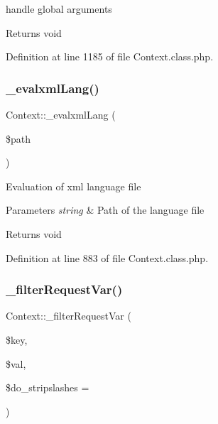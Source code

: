 handle global arguments

\begin{DoxyReturn}{Returns}
void 
\end{DoxyReturn}


Definition at line 1185 of file Context.\+class.\+php.

\hypertarget{classContext_a45bd19b6edf9e66582842a3f6e50fa4b}{}\label{classContext_a45bd19b6edf9e66582842a3f6e50fa4b} 
\subsubsection{\texorpdfstring{\+\_\+evalxml\+Lang()}{\_evalxmlLang()}}
{\footnotesize\ttfamily Context\+::\+\_\+evalxml\+Lang (\begin{DoxyParamCaption}\item[{}]{\$path }\end{DoxyParamCaption})}

Evaluation of xml language file


\begin{DoxyParams}{Parameters}
{\em string} & Path of the language file \\
\hline
\end{DoxyParams}
\begin{DoxyReturn}{Returns}
void 
\end{DoxyReturn}


Definition at line 883 of file Context.\+class.\+php.

\hypertarget{classContext_a3c411bc0bf786b605af4a7af8ad3ee53}{}\label{classContext_a3c411bc0bf786b605af4a7af8ad3ee53} 
\subsubsection{\texorpdfstring{\+\_\+filter\+Request\+Var()}{\_filterRequestVar()}}
{\footnotesize\ttfamily Context\+::\+\_\+filter\+Request\+Var (\begin{DoxyParamCaption}\item[{}]{\$key,  }\item[{}]{\$val,  }\item[{}]{\$do\+\_\+stripslashes = {} }\end{DoxyParamCaption})}

